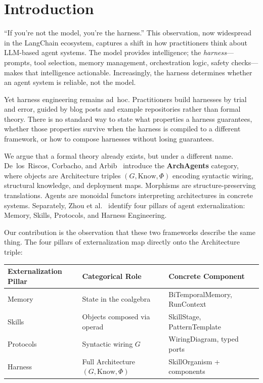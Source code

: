 \section{Introduction}

``If you're not the model, you're the harness.'' This observation, now widespread in the LangChain ecosystem, captures a shift in how practitioners think about LLM-based agent systems. The model provides intelligence; the \emph{harness}---prompts, tool selection, memory management, orchestration logic, safety checks---makes that intelligence actionable. Increasingly, the harness determines whether an agent system is reliable, not the model.

Yet harness engineering remains ad~hoc. Practitioners build harnesses by trial and error, guided by blog posts and example repositories rather than formal theory. There is no standard way to state what properties a harness guarantees, whether those properties survive when the harness is compiled to a different framework, or how to compose harnesses without losing guarantees.

We argue that a formal theory already exists, but under a different name. De~los~Riscos, Corbacho, and Arbib~\cite{delosriscos2026categorical} introduce the \textbf{ArchAgents} category, where objects are Architecture triples $(G, \mathrm{Know}, \Phi)$ encoding syntactic wiring, structural knowledge, and deployment maps. Morphisms are structure-preserving translations. Agents are monoidal functors interpreting architectures in concrete systems. Separately, Zhou et al.~\cite{zhou2026externalization} identify four pillars of agent externalization: Memory, Skills, Protocols, and Harness Engineering.

Our contribution is the observation that these two frameworks describe the same thing. The four pillars of externalization map directly onto the Architecture triple:

\begin{center}
\small
\begin{tabular}{@{}lll@{}}
\toprule
\textbf{Externalization Pillar} & \textbf{Categorical Role} & \textbf{Concrete Component} \\
\midrule
Memory & State in the coalgebra & BiTemporalMemory, RunContext \\
Skills & Objects composed via operad & SkillStage, PatternTemplate \\
Protocols & Syntactic wiring $G$ & WiringDiagram, typed ports \\
Harness & Full Architecture $(G, \mathrm{Know}, \Phi)$ & SkillOrganism + components \\
\bottomrule
\end{tabular}
\end{center}


